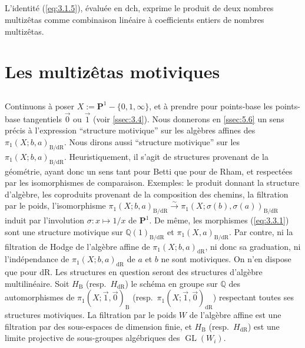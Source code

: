 \documentclass[11pt,a4paper]{article}
\theoremstyle{plain}
\theoremstyle{definition}
\DeclareMathOperator{\GL}{GL}
\newcommand{\Q}{\mathbb{Q}}
\newcommand{\dR}{\mathrm{dR}}
\newcommand{\B}{\mathrm{B}}
\begin{document}
\subsection{}\label{ssec:3.6}

L'identit\'e (\ref{eq:3.1.5}), \'evalu\'ee en $\mathrm{dch}$, exprime le produit de deux nombres multiz\^etas comme combinaison lin\'eaire \`a coefficients entiers de nombres multiz\^etas.

\section{Les multiz\^etas motiviques}\label{sec:4}

\subsection{}\label{ssec:4.1}

Continuons \`a poser $X := \mathbf{P}^1 - \{0,1,\infty\}$, et \`a prendre pour points-base les points-base tangentiels $\vec{0}$ ou $\vec{1}$ (voir \ref{ssec:3.4}). Nous donnerons en \ref{ssec:5.6} un sens pr\'ecis \`a l'expression ``structure motivique'' sur les alg\`ebres affines des $\pi_1(X;b,a)_{\B/\dR}$. Nous dirons aussi ``structure motivique'' sur les $\pi_1(X;b,a)_{\B/\dR}$. Heuristiquement, il s'agit de structures provenant de la g\'eom\'etrie, ayant donc un sens tant pour Betti que pour de Rham, et respect\'ees par les isomorphismes de comparaison. Exemples: le produit donnant la structure d'alg\`ebre, les coproduits provenant de la composition des chemins, la filtration par le poids, l'isomorphisme $\pi_1(X;b,a)_{\B/\dR} \xrightarrow{\sim} \pi_1(X;\sigma(b),\sigma(a))_{\B/\dR}$ induit par l'involution $\sigma: x \mapsto 1/x$ de $\mathbf{P}^1$. De m\^eme, les morphismes (\ref{eq:3.3.1}) sont une structure motivique sur $\Q(1)_{\B/\dR}$ et $\pi_1(X,a)_{\B/\dR}$. Par contre, ni la filtration de Hodge de l'alg\`ebre affine de $\pi_1(X;b,a)_{\dR}$, ni donc sa graduation, ni l'ind\'ependance de $\pi_1(X;b,a)_{\dR}$ de $a$ et $b$ ne sont motiviques. On n'en dispose que pour $\dR$. Les structures en question seront des structures d'alg\`ebre multilin\'eaire. Soit $H_{\B}$ (resp.~$H_{\dR}$) le sch\'ema en groupe sur $\Q$ des automorphismes de $\pi_1(X;\vec{1},\vec{0})_{\B}$ (resp.~$\pi_1(X;\vec{1},\vec{0})_{\dR}$) respectant toutes ses structures motiviques. La filtration par le poids $W$ de l'alg\`ebre affine est une filtration par des sous-espaces de dimension finie, et $H_{\B}$ (resp.~$H_{\dR}$) est une limite projective de sous-groupes alg\'ebriques des $\GL(W_i)$.
\end{document}
